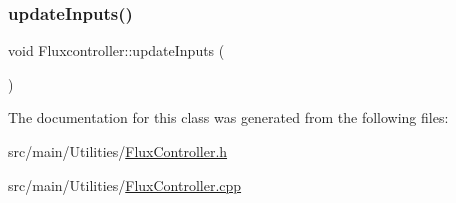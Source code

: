 \subsubsection{\texorpdfstring{update\+Inputs()}{updateInputs()}}
{\footnotesize\ttfamily void Fluxcontroller\+::update\+Inputs (\begin{DoxyParamCaption}{ }\end{DoxyParamCaption})}



The documentation for this class was generated from the following files\+:\begin{DoxyCompactItemize}
\item 
src/main/\+Utilities/\hyperlink{FluxController_8h}{Flux\+Controller.\+h}\item 
src/main/\+Utilities/\hyperlink{FluxController_8cpp}{Flux\+Controller.\+cpp}\end{DoxyCompactItemize}
